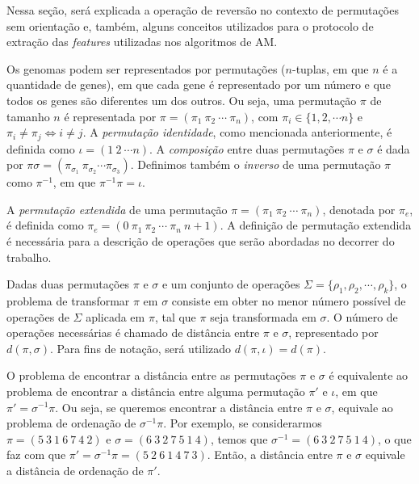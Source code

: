 \documentclass[runningheads,a4paper]{llncs}
\begin{document}
Nessa seção, será explicada a operação de reversão no contexto de permutações sem orientação e, também, alguns conceitos utilizados para o protocolo de extração das \textit{features} utilizadas nos algoritmos de AM.

Os genomas podem ser representados por permutações ($n$-tuplas, em que $n$ é a quantidade de genes), em que cada gene é representado por um número e que todos os genes são diferentes um dos outros. Ou seja, uma permutação $\pi$ de tamanho $n$ é representada por $\pi=(\pi_1\ \pi_2\ \cdots \ \pi_n)$, com $\pi_i \in \{1,2,\cdots n\}$ e $\pi_i \neq \pi_j \iff i \neq j$. A \textit{permutação identidade}, como mencionada anteriormente, é definida como $\iota = (1\ 2\ \cdots n)$. A \textit{composição} entre duas permutações $\pi$ e $\sigma$ é dada por $\pi\sigma=(\pi_{\sigma_1}\ \pi_{\sigma_2} \cdots \pi_{\sigma_3})$. Definimos também o \textit{inverso} de uma permutação $\pi$ como $\pi^{-1}$, em que $\pi^{-1}\pi=\iota$.

A \textit{permutação extendida} de uma permutação $\pi=(\pi_1\ \pi_2\ \cdots \ \pi_n)$, denotada por $\pi_e$, é definida como $\pi_e=(0\ \pi_1\ \pi_2\ \cdots \ \pi_n \ n+1)$. A definição de permutação extendida é necessária para a descrição de operações que serão abordadas no decorrer do trabalho.

Dadas duas permutações $\pi$ e $\sigma$ e um conjunto de operações $\Sigma=\{\rho_1, \rho_2, \cdots, \rho_k \}$, o problema de transformar $\pi$ em $\sigma$ consiste em obter no menor número possível de operações de $\Sigma$ aplicada em $\pi$, tal que $\pi$ seja transformada em $\sigma$. O número de operações necessárias é chamado de distância entre $\pi$ e $\sigma$, representado por $d(\pi,\sigma)$. Para fins de notação, será utilizado $d(\pi,\iota)=d(\pi)$.

O problema de encontrar a distância entre as permutações $\pi$ e $\sigma$ é equivalente ao problema de encontrar a distância entre alguma permutação $\pi'$ e $\iota$, em que $\pi'=\sigma^{-1}\pi$. Ou seja, se queremos encontrar a distância entre $\pi$ e $\sigma$, equivale ao problema de ordenação de $\sigma^{-1}\pi$. Por exemplo, se considerarmos $\pi=(5\ 3\ 1\ 6\ 7\ 4\ 2)$ e $\sigma=(6\ 3\ 2\ 7\ 5\ 1\ 4)$, temos que $\sigma^{-1}=(6\ 3\ 2\ 7\ 5\ 1\ 4)$, o que faz com que $\pi'=\sigma^{-1}\pi=(5\ 2\ 6\ 1\ 4\ 7\ 3)$. Então, a distância entre $\pi$ e $\sigma$ equivale a distância de ordenação de $\pi'$.

\end{document}
